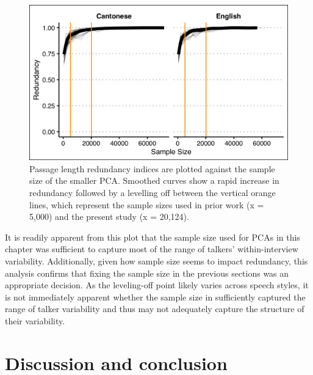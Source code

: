 \begin{figure}[bthp]
    \begin{center}
    \includegraphics[width=0.75\linewidth]{figures/ch3_passagelength.png} 
    \caption{Passage length redundancy indices are plotted against the sample size of the smaller PCA. Smoothed curves show a rapid increase in redundancy followed by a levelling off between the vertical orange lines, which represent the sample sizes used in prior work (x = 5,000) and the present study (x = 20,124).}
    \label{ch3:fig:passagelength}
    \end{center}
\end{figure}

It is readily apparent from this plot that the sample size used for PCAs in this chapter was sufficient to capture most of the range of talkers' within-interview variability. Additionally, given how sample size seems to impact redundancy, this analysis confirms that fixing the sample size in the previous sections was an appropriate decision. As the leveling-off point likely varies across speech styles, it is not immediately apparent whether the sample size in \citet{lee_2019_acoustic} sufficiently captured the range of talker variability and thus may not adequately capture the structure of their variability. 


\section{Discussion and conclusion}\label{ch3:sec:discussion}

